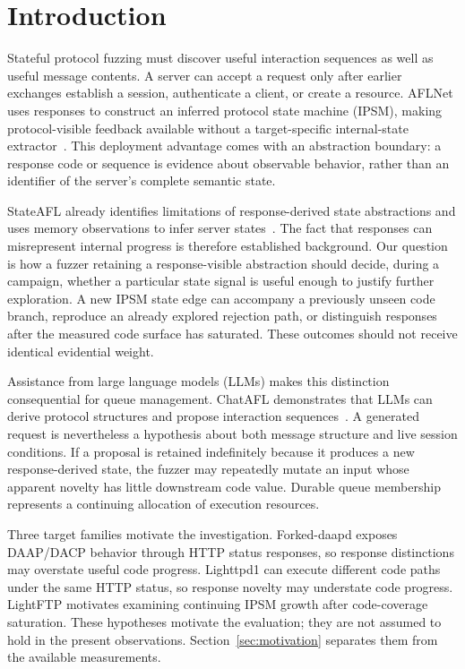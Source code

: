 \documentclass[final,5p,times,number]{elsarticle}
\begin{document}
\section{Introduction}
Stateful protocol fuzzing must discover useful interaction sequences as well as useful message contents. A server can accept a request only after earlier exchanges establish a session, authenticate a client, or create a resource. AFLNet uses responses to construct an inferred protocol state machine (IPSM), making protocol-visible feedback available without a target-specific internal-state extractor~\cite{aflnet}. This deployment advantage comes with an abstraction boundary: a response code or sequence is evidence about observable behavior, rather than an identifier of the server's complete semantic state.

StateAFL already identifies limitations of response-derived state abstractions and uses memory observations to infer server states~\cite{stateafl}. The fact that responses can misrepresent internal progress is therefore established background. Our question is how a fuzzer retaining a response-visible abstraction should decide, during a campaign, whether a particular state signal is useful enough to justify further exploration. A new IPSM state edge can accompany a previously unseen code branch, reproduce an already explored rejection path, or distinguish responses after the measured code surface has saturated. These outcomes should not receive identical evidential weight.

Assistance from large language models (LLMs) makes this distinction consequential for queue management. ChatAFL demonstrates that LLMs can derive protocol structures and propose interaction sequences~\cite{chatafl}. A generated request is nevertheless a hypothesis about both message structure and live session conditions. If a proposal is retained indefinitely because it produces a new response-derived state, the fuzzer may repeatedly mutate an input whose apparent novelty has little downstream code value. Durable queue membership represents a continuing allocation of execution resources.

Three target families motivate the investigation. Forked-daapd exposes DAAP/DACP behavior through HTTP status responses, so response distinctions may overstate useful code progress. Lighttpd1 can execute different code paths under the same HTTP status, so response novelty may understate code progress. LightFTP motivates examining continuing IPSM growth after code-coverage saturation. These hypotheses motivate the evaluation; they are not assumed to hold in the present observations. Section~\ref{sec:motivation} separates them from the available measurements.
\end{document}
